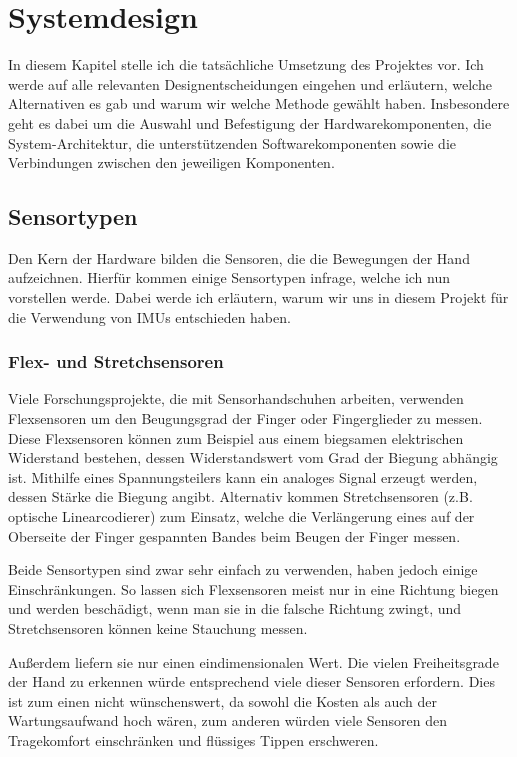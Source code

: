 \chapter{Systemdesign} 

In diesem Kapitel stelle ich die tatsächliche Umsetzung des Projektes vor. Ich
werde auf alle relevanten Designentscheidungen eingehen und erläutern, welche
Alternativen es gab und warum wir welche Methode gewählt haben. Insbesondere
geht es dabei um die Auswahl und Befestigung der Hardwarekomponenten, die
System-Architektur, die unterstützenden Softwarekomponenten sowie die
Verbindungen zwischen den jeweiligen Komponenten.

\section{Sensortypen}

Den Kern der Hardware bilden die Sensoren, die die Bewegungen der Hand
aufzeichnen. Hierfür kommen einige Sensortypen infrage, welche ich nun
vorstellen werde. Dabei werde ich erläutern, warum wir uns in diesem Projekt
für die Verwendung von IMUs entschieden haben.

\subsection{Flex- und Stretchsensoren} 

Viele Forschungsprojekte, die mit Sensorhandschuhen arbeiten, verwenden
Flexsensoren um den Beugungsgrad der Finger oder Fingerglieder zu messen.
Diese Flexsensoren können zum Beispiel aus einem biegsamen elektrischen
Widerstand bestehen, dessen Widerstandswert vom Grad der Biegung abhängig ist.
Mithilfe eines Spannungsteilers kann ein analoges Signal erzeugt werden, dessen
Stärke die Biegung angibt. Alternativ kommen Stretchsensoren (z.B. optische
Linearcodierer) zum Einsatz, welche die Verlängerung eines auf der Oberseite
der Finger gespannten Bandes beim Beugen der Finger messen.

Beide Sensortypen sind zwar sehr einfach zu verwenden, haben jedoch einige
Einschränkungen. So lassen sich Flexsensoren meist nur in eine Richtung biegen
und werden beschädigt, wenn man sie in die falsche Richtung zwingt, und
Stretchsensoren können keine Stauchung messen.

Außerdem liefern sie nur einen eindimensionalen Wert. Die vielen Freiheitsgrade
der Hand zu erkennen würde entsprechend viele dieser Sensoren erfordern. Dies
ist zum einen nicht wünschenswert, da sowohl die Kosten als auch der
Wartungsaufwand hoch wären, zum anderen würden viele Sensoren den Tragekomfort
einschränken und flüssiges Tippen erschweren.

